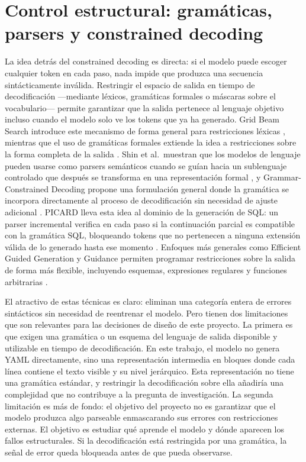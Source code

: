 \section{Control estructural: gramáticas, parsers y constrained decoding}
\label{sec:estado-arte-control-estructural}

La idea detrás del constrained decoding es directa: si el modelo puede escoger cualquier token en cada paso, nada impide que produzca una secuencia sintácticamente inválida. Restringir el espacio de salida en tiempo de decodificación ---mediante léxicos, gramáticas formales o máscaras sobre el vocabulario--- permite garantizar que la salida pertenece al lenguaje objetivo incluso cuando el modelo solo ve los tokens que ya ha generado. Grid Beam Search introduce este mecanismo de forma general para restricciones léxicas \citep{hokamp2017lexically}, mientras que el uso de gramáticas formales extiende la idea a restricciones sobre la forma completa de la salida \citep{bunel2018leveraginggrammar}. Shin et al.\ muestran que los modelos de lenguaje pueden usarse como parsers semánticos cuando se guían hacia un sublenguaje controlado que después se transforma en una representación formal \citep{shin2021constrainedsemanticparsers}, y Grammar-Constrained Decoding propone una formulación general donde la gramática se incorpora directamente al proceso de decodificación sin necesidad de ajuste adicional \citep{geng2023grammar}. PICARD lleva esta idea al dominio de la generación de SQL: un parser incremental verifica en cada paso si la continuación parcial es compatible con la gramática SQL, bloqueando tokens que no pertenecen a ninguna extensión válida de lo generado hasta ese momento \citep{scholak2021picard}. Enfoques más generales como Efficient Guided Generation y Guidance permiten programar restricciones sobre la salida de forma más flexible, incluyendo esquemas, expresiones regulares y funciones arbitrarias \citep{willard2023efficient, beurerkellner2023guidance}.

El atractivo de estas técnicas es claro: eliminan una categoría entera de errores sintácticos sin necesidad de reentrenar el modelo. Pero tienen dos limitaciones que son relevantes para las decisiones de diseño de este proyecto. La primera es que exigen una gramática o un esquema del lenguaje de salida disponible y utilizable en tiempo de decodificación. En este trabajo, el modelo no genera YAML directamente, sino una representación intermedia en bloques donde cada línea contiene el texto visible y su nivel jerárquico. Esta representación no tiene una gramática estándar, y restringir la decodificación sobre ella añadiría una complejidad que no contribuye a la pregunta de investigación. La segunda limitación es más de fondo: el objetivo del proyecto no es garantizar que el modelo produzca algo parseable enmascarando sus errores con restricciones externas. El objetivo es estudiar qué aprende el modelo y dónde aparecen los fallos estructurales. Si la decodificación está restringida por una gramática, la señal de error queda bloqueada antes de que pueda observarse.

